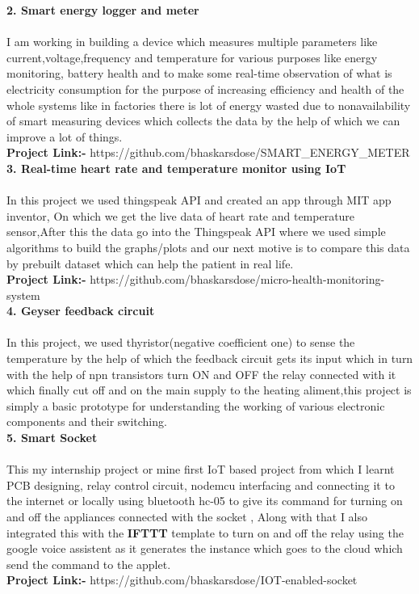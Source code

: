 \documentclass[10pt]{report}
\begin{document}
\noindent\textbf{\large 2. Smart energy logger and meter\\[1pt]}
\\I am working in building a device which measures multiple parameters like current,voltage,frequency and temperature for various purposes like energy monitoring, battery health and to make some real-time observation of what is electricity consumption for the purpose of increasing efficiency and health of the whole systems like in factories there is lot of energy wasted due to nonavailability of smart measuring devices which collects the data by the help of which we can improve a lot of things.
\\\textbf{Project Link:-} https://github.com/bhaskarsdose/SMART\_ENERGY\_METER\\[2pt]

\noindent\textbf{\large 3. Real-time heart rate and temperature monitor using IoT\\[1pt]}
\\In this project we used thingspeak API and created an app through MIT app inventor, On which we get the live data of heart rate and temperature sensor,After this the data go into the Thingspeak API where we used simple algorithms to build the graphs/plots and our next motive is to compare this data by prebuilt dataset which can help the patient in real life.
\\\textbf{Project Link:-} https://github.com/bhaskarsdose/micro-health-monitoring-system\\[2pt]

\noindent\textbf{\large 4. Geyser feedback circuit\\[1pt]}
\\In this project, we used thyristor(negative coefficient one) to sense the temperature by the help of which the feedback circuit gets its input which in turn with the help of npn transistors turn ON and OFF the relay connected with it which finally cut off and on the main supply to the heating aliment,this project is simply a basic prototype for understanding the working of various electronic components and their switching.\\[2pt]

\noindent\textbf{\large 5. Smart Socket\\[1pt]}
\\This my internship project or mine first IoT based project from which I learnt PCB designing, relay control circuit, nodemcu interfacing and connecting it to the internet or locally using bluetooth hc-05 to give its command for turning on and off the appliances connected with the socket , Along with that I also integrated this with the \textbf{IFTTT} template to turn on and off the relay using the google voice assistent as it generates the instance which goes to the cloud which send the command to the applet.
\\\textbf{Project Link:-} https://github.com/bhaskarsdose/IOT-enabled-socket\\[2pt]
\end{document}
